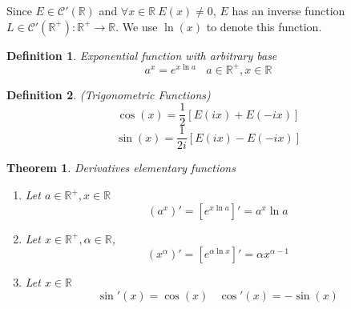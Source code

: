 \documentclass[aps,pra,onecolumn,notitlepage,superscriptaddress]{revtex4-1}
\newcommand{\R}{\mathbb{R}}
\newtheorem{theo}{Theorem}
\newtheorem{defi}{Definition}
\begin{document}
    Since $E \in \mathscr{C}'(\R)$ and $\forall x \in \R \ E(x) \neq 0$, $E$ has an inverse function $L \in \mathscr{C}'(\R^+): \R^+ \to \R$. We use $\ln(x)$ to denote this function.

    \begin{defi}
        Exponential function with arbitrary base
        \begin{equation}
            a^x = e^{x \ln a} \ \ \ \ a \in \R^+, x \in \R
        \end{equation}
    \end{defi}

    \begin{defi}
        (Trigonometric Functions) 
        \begin{equation}
            \cos(x) = \frac{1}{2}[E(ix)+E(-ix)]
        \end{equation}
        \begin{equation}
            \sin(x) = \frac{1}{2i}[E(ix)-E(-ix)]
        \end{equation}
    \end{defi}

    \begin{theo}
        Derivatives elementary functions
        \begin{enumerate}
            \item Let $a \in \R^+, x \in \R$
            \begin{equation}
                \left( a^x \right)' = \left[ e^{x \ln a} \right]' = a^x \ln a
            \end{equation}

            \item Let $x \in \R^+, \alpha \in \R$,
            \begin{equation}
                \left(x^{\alpha}\right)' = \left[ e^{\alpha \ln x} \right]' = \alpha x^{\alpha-1} 
            \end{equation}

            \item Let $x \in \R$
            \begin{equation}
                \sin'(x) = \cos(x) \ \ \ \ \cos'(x) = -\sin(x)
            \end{equation}
        \end{enumerate} 
    \end{theo}
\end{document}
